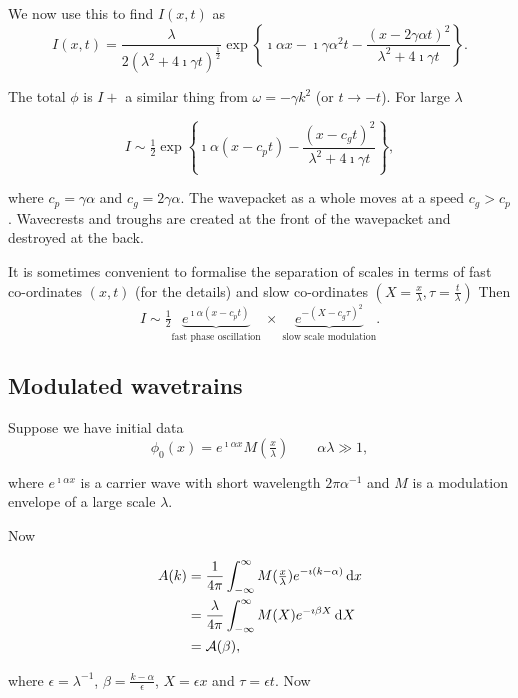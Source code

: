 \documentclass{notes}
\begin{document}
We now use this to find $I(x,t)$ as
\[
I(x,t) = \frac{\lambda}{2 \left(\lambda^2 + 4 \imath \gamma t
\right)^{\frac{1}{2}}} \exp \left\{ \imath \alpha x - \imath \gamma
\alpha^2 t - \frac{\left( x - 2 \gamma \alpha t\right)^2}{\lambda^2 +
4 \imath \gamma t} \right\}.
\]

The total $\phi$ is $I + $ a similar thing from $\omega = - \gamma
k^2$ (or $t \to - t$).  For large $\lambda$

\[
I \sim \tfrac{1}{2} \exp \left\{ \imath \alpha (x - c_p t)
- \frac{\left( x - c_g t\right)^2}{\lambda^2 +
4 \imath \gamma t} \right\},
\]

where $c_p = \gamma \alpha$ and $c_g = 2 \gamma \alpha$.  The wavepacket
as a whole moves at a speed $c_g > c_p$.  Wavecrests and troughs are
created at the front of the wavepacket and destroyed at the back.

It is sometimes convenient to formalise the separation of
scales in terms of fast co-ordinates $(x,t)$ (for the details)
and slow co-ordinates $(X=\tfrac{x}{\lambda},\tau = \tfrac{t}{\lambda})$
Then
\[
I \sim \tfrac{1}{2} \underbrace{e^{\imath \alpha( x - c_p t)}}_{\text{
fast phase oscillation}}\ \times\
 \underbrace{ e^{-( X - c_g \tau)^2}}_{\text{slow scale modulation}}.
\]

\subsection{Modulated wavetrains}

Suppose we have initial data
\[
\phi_0(x) = e^{\imath \alpha x} M(\tfrac{x}{\lambda}) \qquad \alpha \lambda
\gg 1,
\]

where $e^{\imath \alpha x}$ is a carrier wave with short wavelength
$2 \pi \alpha^{-1}$ and $M$ is a modulation envelope of a large
scale $\lambda$.

\newcommand{\sA}{\mathcal{A}}

Now

\begin{align*}
A(k) &= \frac{1}{4 \pi} \int_{-\infty}^\infty M(\tfrac{x}{\lambda})
e^{- \imath(k-\alpha)}\, \ud x \\
&= \frac{\lambda}{4 \pi} \int_{-\infty}^\infty M(X)
e^{- \imath \beta X}\, \ud X\\
&= \sA(\beta),
\end{align*}

where $\epsilon = \lambda^{-1}$, $\beta = \tfrac{k - \alpha}{\epsilon}$,
$X = \epsilon x$ and $\tau = \epsilon t$.  Now
\end{document}
